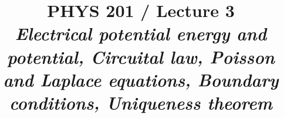 \renewcommand{\prevlecture}{2 }
\renewcommand{\thislecture}{3 }
\renewcommand{\nextlecture}{4 }

%
%

\title[PHYS 201 / Lecture \thislecture]
{
  PHYS 201 / Lecture \thislecture\\
  {\it Electrical potential energy and potential, Circuital law,
       Poisson and Laplace equations, Boundary conditions, Uniqueness theorem}\\
}



\begin{frame}[plain]
  \titlepage
\end{frame}


%
%

\renewcommand{\lecturesummarytitle}{Revision }


%
%

